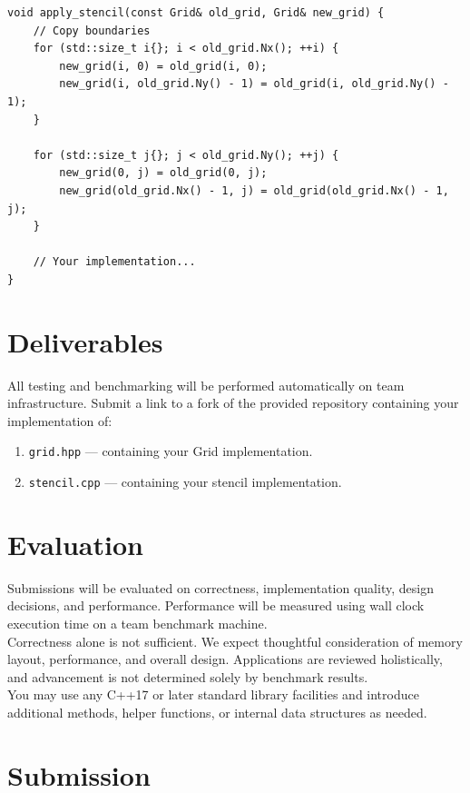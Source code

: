 \documentclass[11pt, a4paper]{article}
\newcommand{\code}[1]{\texttt{#1}}
\begin{document}
\begin{lstlisting}[style=cppinterface]
void apply_stencil(const Grid& old_grid, Grid& new_grid) {
    // Copy boundaries
    for (std::size_t i{}; i < old_grid.Nx(); ++i) {
        new_grid(i, 0) = old_grid(i, 0);
        new_grid(i, old_grid.Ny() - 1) = old_grid(i, old_grid.Ny() - 1);
    }

    for (std::size_t j{}; j < old_grid.Ny(); ++j) {
        new_grid(0, j) = old_grid(0, j);
        new_grid(old_grid.Nx() - 1, j) = old_grid(old_grid.Nx() - 1, j);
    }

    // Your implementation...
}
\end{lstlisting}

\section{Deliverables}

All testing and benchmarking will be performed automatically on team infrastructure. Submit a link to a fork of the provided repository containing your implementation of:
 
\begin{enumerate}[leftmargin=1.5em, itemsep=0.2em]
    \item \code{grid.hpp} --- containing your Grid implementation.
    \item \code{stencil.cpp} --- containing your stencil implementation.
\end{enumerate}

\section{Evaluation}
 
Submissions will be evaluated on correctness, implementation quality, design decisions, and performance. Performance will be measured using wall clock execution time on a team benchmark machine.\\

Correctness alone is not sufficient. We expect thoughtful consideration of memory layout, performance, and overall design. Applications are reviewed holistically, and advancement is not determined solely by benchmark results.\\

You may use any C++17 or later standard library facilities and introduce additional methods, helper functions, or internal data structures as needed.

\section{Submission}
\end{document}
